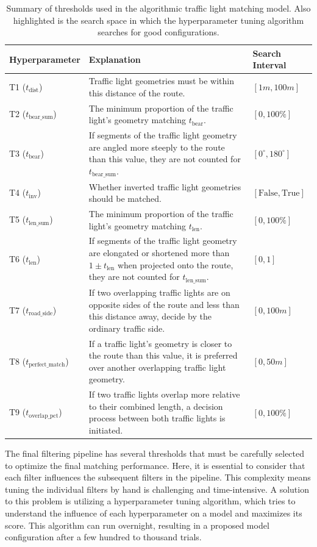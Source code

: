 \begin{table}[!b]
\caption{Summary of thresholds used in the algorithmic traffic light matching model. Also highlighted is the search space in which the hyperparameter tuning algorithm searches for good configurations.}
\begin{tabular}{@{}lp{8cm}l@{}}
\toprule
\textbf{Hyperparameter}  & \textbf{Explanation} & \textbf{Search Interval} \\
\midrule
T1 ($t_{\text{dist}}$) & Traffic light geometries must be within this distance of the route. & $[1m, 100m]$ \\
T2 ($t_{\text{bear\_sum}}$) & The minimum proportion of the traffic light's geometry matching $t_{\text{bear}}$. & $[0, 100\%]$ \\
T3 ($t_{\text{bear}}$) & If segments of the traffic light geometry are angled more steeply to the route than this value, they are not counted for $t_{\text{bear\_sum}}$. & $[0^{\circ}, 180^{\circ}]$ \\
T4 ($t_{\text{inv}}$) & Whether inverted traffic light geometries should be matched. & $[\text{False}, \text{True}]$ \\
T5 ($t_{\text{len\_sum}}$) & The minimum proportion of the traffic light's geometry matching $t_{\text{len}}$. & $[0, 100\%]$ \\
T6 ($t_{\text{len}}$) & If segments of the traffic light geometry are elongated or shortened more than $1 \pm t_{\text{len}}$ when projected onto the route, they are not counted for $t_{\text{len\_sum}}$. & $[0, 1]$\\
T7 ($t_{\text{road\_side}}$) & If two overlapping traffic lights are on opposite sides of the route and less than this distance away, decide by the ordinary traffic side. & $[0, 100m]$ \\
T8 ($t_{\text{perfect\_match}}$) & If a traffic light's geometry is closer to the route than this value, it is preferred over another overlapping traffic light geometry. & $[0, 50m]$ \\
T9 ($t_{\text{overlap\_pct}}$) & If two traffic lights overlap more relative to their combined length, a decision process between both traffic lights is initiated. & $[0, 100\%]$ \\
\bottomrule
\end{tabular}
\label{tab:hyperparameter-space}
\end{table}

The final filtering pipeline has several thresholds that must be carefully selected to optimize the final matching performance. Here, it is essential to consider that each filter influences the subsequent filters in the pipeline. This complexity means tuning the individual filters by hand is challenging and time-intensive. A solution to this problem is utilizing a hyperparameter tuning algorithm, which tries to understand the influence of each hyperparameter on a model and maximizes its score. This algorithm can run overnight, resulting in a proposed model configuration after a few hundred to thousand trials. 

